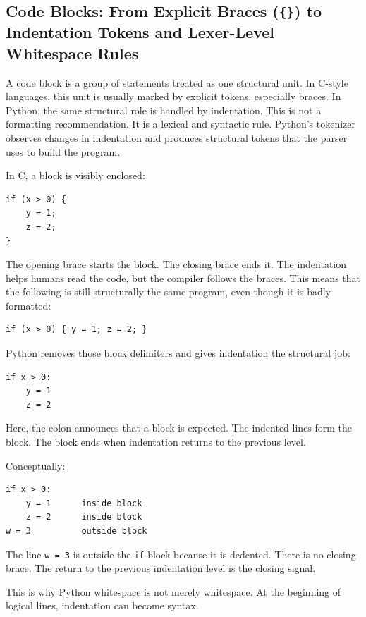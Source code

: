 \subsection{Code Blocks: From Explicit Braces (\texttt{\{\}}) to Indentation Tokens and Lexer-Level Whitespace Rules}

A code block is a group of statements treated as one structural unit. In C-style languages, this unit is usually marked by explicit tokens, especially braces. In Python, the same structural role is handled by indentation. This is not a formatting recommendation. It is a lexical and syntactic rule. Python's tokenizer observes changes in indentation and produces structural tokens that the parser uses to build the program.

In C, a block is visibly enclosed:

\begin{verbatim}
if (x > 0) {
    y = 1;
    z = 2;
}
\end{verbatim}

The opening brace starts the block. The closing brace ends it. The indentation helps humans read the code, but the compiler follows the braces. This means that the following is still structurally the same program, even though it is badly formatted:

\begin{verbatim}
if (x > 0) { y = 1; z = 2; }
\end{verbatim}

Python removes those block delimiters and gives indentation the structural job:

\begin{verbatim}
if x > 0:
    y = 1
    z = 2
\end{verbatim}

Here, the colon announces that a block is expected. The indented lines form the block. The block ends when indentation returns to the previous level.

Conceptually:

\begin{verbatim}
if x > 0:
    y = 1      inside block
    z = 2      inside block
w = 3          outside block
\end{verbatim}

The line \texttt{w = 3} is outside the \texttt{if} block because it is dedented. There is no closing brace. The return to the previous indentation level is the closing signal.

This is why Python whitespace is not merely whitespace. At the beginning of logical lines, indentation can become syntax.

